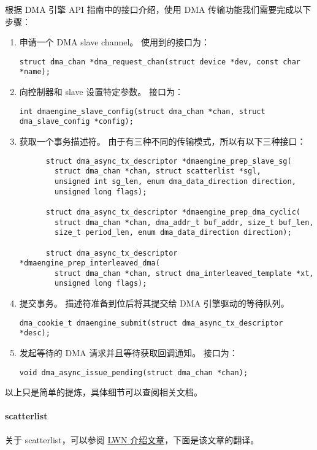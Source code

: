 根据 DMA 引擎 API 指南中的接口介绍，使用 DMA 传输功能我们需要完成以下步骤：

\begin{enumerate}
  \item 申请一个 DMA slave channel。
    使用到的接口为：

    \lstinline!struct dma_chan *dma_request_chan(struct device *dev, const char *name);!

  \item 向控制器和 slave 设置特定参数。
    接口为：

    \lstinline!int dmaengine_slave_config(struct dma_chan *chan, struct dma_slave_config *config);!

  \item 获取一个事务描述符。
    由于有三种不同的传输模式，所以有以下三种接口：
    \begin{lstlisting}
      struct dma_async_tx_descriptor *dmaengine_prep_slave_sg(
        struct dma_chan *chan, struct scatterlist *sgl,
        unsigned int sg_len, enum dma_data_direction direction,
        unsigned long flags);

      struct dma_async_tx_descriptor *dmaengine_prep_dma_cyclic(
        struct dma_chan *chan, dma_addr_t buf_addr, size_t buf_len,
        size_t period_len, enum dma_data_direction direction);

      struct dma_async_tx_descriptor *dmaengine_prep_interleaved_dma(
        struct dma_chan *chan, struct dma_interleaved_template *xt,
        unsigned long flags);
    \end{lstlisting}
  \item 提交事务。
    描述符准备到位后将其提交给 DMA 引擎驱动的等待队列。

    \lstinline!dma_cookie_t dmaengine_submit(struct dma_async_tx_descriptor *desc);!

  \item 发起等待的 DMA 请求并且等待获取回调通知。
    接口为：

    \lstinline!void dma_async_issue_pending(struct dma_chan *chan);!
\end{enumerate}

以上只是简单的提炼，具体细节可以查阅相关文档。

\paragraph{scatterlist}

关于 scatterlist，可以参阅 \href{https://lwn.net/Articles/234617/}{LWN 介绍文章}，下面是该文章的翻译。

